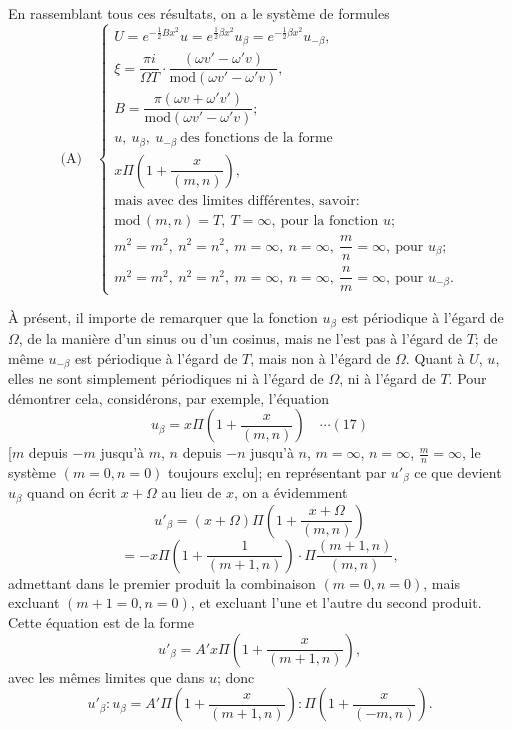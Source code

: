 \documentclass[12pt,a4paper]{article}
\begin{document}
En rassemblant tous ces r\'esultats, on a le syst\`eme de formules
\[
\text{(A)}\quad
\begin{cases}
U = e^{-\frac12 Bx^2}u = e^{\frac12\beta x^2}u_\beta = e^{-\frac12\beta x^2}u_{-\beta}, \\[4pt]
\xi = \dfrac{\pi i}{\Omega T}\cdot\dfrac{(\omega v' - \omega' v)}{\mathrm{mod}(\omega v' - \omega' v)},\\[8pt]
B = \dfrac{\pi(\omega v + \omega' v')}{\mathrm{mod}(\omega v' - \omega' v)};\\[6pt]
u,\ u_\beta,\ u_{-\beta}\ \text{des fonctions de la forme}\\[2pt]
x\Pi\!\left(1 + \dfrac{x}{(m,n)}\right),\\[6pt]
\text{mais avec des limites diff\'erentes, savoir:}\\[2pt]
\mathrm{mod}\,(m,n) = T,\ T = \infty,\ \text{pour la fonction $u$;}\\[2pt]
m^2 = m^2,\ n^2 = n^2,\ m = \infty,\ n = \infty,\ \dfrac{m}{n} = \infty,\ \text{pour $u_\beta$};\\[2pt]
m^2 = m^2,\ n^2 = n^2,\ m = \infty,\ n = \infty,\ \dfrac{n}{m} = \infty,\ \text{pour $u_{-\beta}$}.
\end{cases}
\]

\`A pr\'esent, il importe de remarquer que la fonction $u_\beta$ est p\'eriodique \`a l'\'egard de $\Omega$, de la mani\`ere d'un sinus ou d'un cosinus, mais ne l'est pas \`a l'\'egard de $T$; de m\^eme $u_{-\beta}$ est p\'eriodique \`a l'\'egard de $T$, mais non \`a l'\'egard de $\Omega$. Quant \`a $U$, $u$, elles ne sont simplement p\'eriodiques ni \`a l'\'egard de $\Omega$, ni \`a l'\'egard de $T$. Pour d\'emontrer cela, consid\'erons, par exemple, l'\'equation
\[
u_\beta = x\Pi\!\left(1 + \frac{x}{(m,n)}\right) \quad\cdots(17)
\]
[$m$ depuis $-m$ jusqu'\`a $m$, $n$ depuis $-n$ jusqu'\`a $n$, $m = \infty$, $n = \infty$, $\tfrac{m}{n} = \infty$, le syst\`eme $(m=0, n=0)$ toujours exclu]; en repr\'esentant par $u'_\beta$ ce que devient $u_\beta$ quand on \'ecrit $x + \Omega$ au lieu de $x$, on a \'evidemment
\[
u'_\beta = (x + \Omega)\Pi\!\left(1 + \frac{x + \Omega}{(m,n)}\right)
\]
\[
= -x\Pi\!\left(1 + \frac{1}{(m+1,n)}\right)\cdot\Pi\frac{(m+1,n)}{(m,n)},
\]
admettant dans le premier produit la combinaison $(m=0, n=0)$, mais excluant $(m+1=0, n=0)$, et excluant l'une et l'autre du second produit. Cette \'equation est de la forme
\[
u'_\beta = A'x\Pi\!\left(1 + \frac{x}{(m+1,n)}\right),
\]
avec les m\^emes limites que dans $u$; donc
\[
u'_\beta : u_\beta = A'\Pi\!\left(1 + \frac{x}{(m+1,n)}\right) : \Pi\!\left(1 + \frac{x}{(-m,n)}\right).
\]
\end{document}
